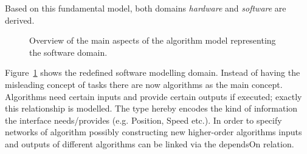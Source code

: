\documentclass[a4paper,twocolumn]{esapub2005} %
\begin{document}
Based on this fundamental model, both domains \emph{hardware} and \emph{software} are derived.
\begin{figure}
    \centering
    \caption{
        Overview of the main aspects of the algorithm model representing the software domain.
    }
    \label{fig:sw_new}
\end{figure}
Figure~\ref{fig:sw_new} shows the redefined software modelling domain.
Instead of having the misleading concept of tasks there are now algorithms as the main concept.
Algorithms need certain inputs and provide certain outputs if executed; exactly this relationship is modelled.
The type hereby encodes the kind of information the interface needs/provides (e.g. Position, Speed etc.).
In order to specify networks of algorithm possibly constructing new higher-order algorithms inputs and outputs of different algorithms can be linked via the dependsOn relation.
\end{document}
